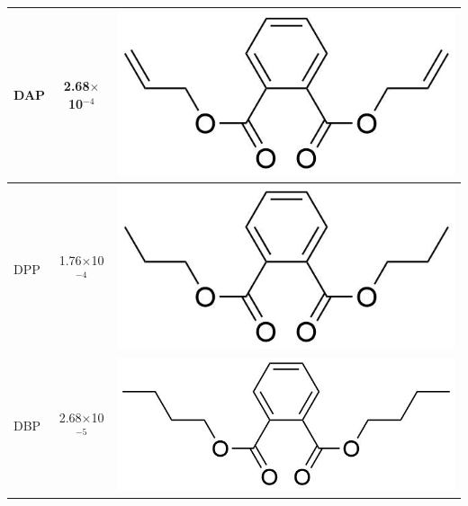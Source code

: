 {\begin{table}
\begin{tabular}{lcc}
DAP &   2.68$\times$10$^{-4}$  &  \begin{minipage}[c]{0.35\linewidth}\centering
\includegraphics[height=0.07\textheight]{pics/PH/DAP_struct2.png}\end{minipage}\\ \midrule
DPP &   1.76$\times$10$^{-4}$ &  \begin{minipage}[c]{0.35\linewidth}\centering
\includegraphics[height=0.07\textheight]{pics/PH/DPP_struct2.png}\end{minipage}\\ \midrule
DBP &   2.68$\times$10$^{-5}$ &  \begin{minipage}[c]{0.35\linewidth}\centering
\includegraphics[height=0.07\textheight]{pics/PH/DBP_struct2.png}\end{minipage}\\ \midrule

\end{tabular}
\end{table}}
